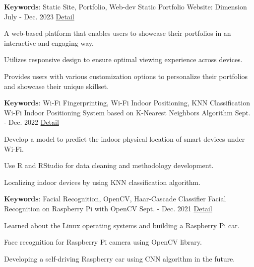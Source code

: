 \begin{cventries}
  \cventry
  {\textbf{Keywords}: Static Site, Portfolio, Web-dev} %
  {Static Portfolio Website: Dimension} %
  {July - Dec. 2023} %
  {\href{https://github.com/Sang-Buster/Portfolio-Dimension}{ Detail}} %
  {
    \begin{cvitems} %
      \item {A web-based platform that enables users to showcase their portfolios in an interactive and engaging way.}
      \item {Utilizes responsive design to ensure optimal viewing experience across devices.}
      \item {Provides users with various customization options to personalize their portfolios and showcase their unique skillset.}
    \end{cvitems}
  }\newline
  \newline



  \cventry
  {\textbf{Keywords}: Wi-Fi Fingerprinting, Wi-Fi Indoor Positioning, KNN Classification} %
  {Wi-Fi Indoor Positioning System based on K-Nearest Neighbors Algorithm} %
  {Sept. - Dec. 2022} %
  {\href{https://github.com/Sang-Buster/Indoor-Positioning-System}{ Detail}} %
  {
    \begin{cvitems} %
      \item {Develop a model to predict the indoor physical location of smart devices under Wi-Fi.}
      \item {Use R and RStudio for data cleaning and methodology development.}
      \item {Localizing indoor devices by using KNN classification algorithm.}
    \end{cvitems}
  }\newline
  \newline



  \cventry
  {\textbf{Keywords}: Facial Recognition, OpenCV, Haar-Cascade Classifier} %
  {Facial Recognition on Raspberry Pi with OpenCV} %
  {Sept. - Dec. 2021} %
  {\href{https://github.com/Sang-Buster/Facial-Recognition}{ Detail}} %
  {
    \begin{cvitems} %
      \item {Learned about the Linux operating systems and building a Raspberry Pi car.}
      \item {Face recognition for Raspberry Pi camera using OpenCV library.}
      \item {Developing a self-driving Raspberry car using CNN algorithm in the future.}
    \end{cvitems}
  }\newline
  \newline

\end{cventries}
